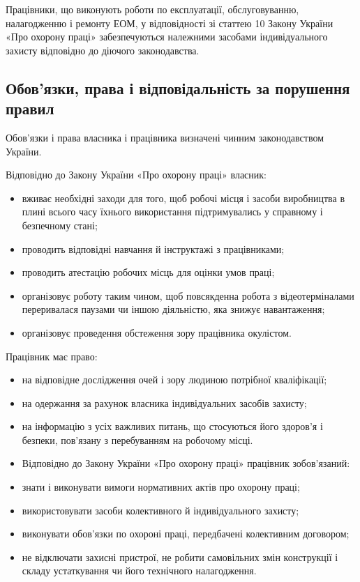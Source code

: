 \documentclass[simple,a4paper,14pt,ukrainian,utf8]{eskdtext}
\begin{document}
\begin{appendices}
                Працівники, що виконують роботи по експлуатації, обслуговуванню, налагодженню і ремонту ЕОМ, у відповідності зі статтею 10 Закону України «Про охорону праці» забезпечуються належними засобами індивідуального захисту відповідно до діючого законодавства.

            \subsection{Обов'язки, права і відповідальність за порушення правил}

                Обов'язки і права власника і працівника визначені чинним законодавством України.

                Відповідно до Закону України «Про охорону праці» власник:

                \begin{itemize}
                    \item вживає необхідні заходи для того, щоб робочі місця і засоби виробництва в плині всього часу їхнього використання підтримувались у справному і безпечному стані;
                    \item проводить відповідні навчання й інструктажі з працівниками;
                    \item проводить атестацію робочих місць для оцінки умов праці;
                    \item організовує роботу таким чином, щоб повсякденна робота з відеотерміналами переривалася паузами чи іншою діяльністю, яка знижує навантаження;
                    \item організовує проведення обстеження зору працівника окулістом.
                \end{itemize}

                Працівник має право:

                \begin{itemize}
                    \item на відповідне дослідження очей і зору людиною потрібної кваліфікації;
                    \item на одержання за рахунок власника індивідуальних засобів захисту;
                    \item на інформацію з усіх важливих питань, що стосуються його здоров'я і безпеки, пов'язану з перебуванням на робочому місці.
                    \item Відповідно до Закону України «Про охорону праці» працівник зобов'язаний:
                    \item знати і виконувати вимоги нормативних актів про охорону праці;
                    \item використовувати засоби колективного й індивідуального захисту;
                    \item виконувати обов'язки по охороні праці, передбачені колективним договором;
                    \item не відключати захисні пристрої, не робити самовільних змін конструкції і складу устаткування чи його технічного налагодження.
                \end{itemize}


\end{appendices}
\end{document}
